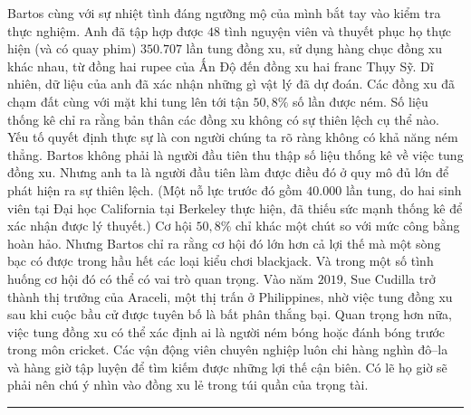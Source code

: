 \begin{multicols}{2}
	\vskip 0.01cm
	Bartos cùng với sự nhiệt tình đáng ngưỡng mộ của mình bắt tay vào kiểm tra thực nghiệm. Anh đã tập hợp được $48$ tình nguyện viên và thuyết phục họ thực hiện (và có quay phim) $350{.}707$ lần tung đồng xu, sử dụng hàng chục đồng xu khác nhau, từ đồng hai rupee của Ấn Độ đến đồng xu hai franc Thụy Sỹ. Dĩ nhiên, dữ liệu của anh  đã xác nhận những gì vật lý đã dự đoán. Các đồng xu đã chạm đất cùng với mặt khi tung lên tới tận $50,8\%$ số lần được ném.
	\vskip 0.01cm
	Số liệu thống kê chỉ ra rằng bản thân các đồng xu không có sự thiên lệch cụ thể nào. Yếu tố quyết định thực sự là con người chúng ta rõ ràng không có khả năng ném thẳng.  Bartos không phải là người đầu tiên thu thập số liệu thống kê về việc tung đồng xu. Nhưng anh ta là người đầu tiên làm được điều đó ở quy mô đủ lớn để phát hiện ra sự thiên lệch. (Một nỗ lực trước đó gồm $40{.}000$ lần tung, do hai sinh viên tại Đại học California tại Berkeley  thực hiện, đã thiếu sức mạnh thống kê để xác nhận được  lý thuyết.)
	\vskip 0.1cm
	Cơ hội $50,8\%$ chỉ khác một chút so với mức công bằng hoàn hảo. Nhưng  Bartos chỉ ra rằng cơ hội đó lớn hơn cả  lợi thế mà một sòng bạc có được trong hầu hết các loại kiểu chơi blackjack. Và trong một số tình huống cơ hội đó có thể có vai trò quan trọng. Vào năm $2019$, Sue Cudilla trở thành thị trưởng của Araceli, một thị trấn ở Philippines, nhờ việc tung đồng xu sau khi cuộc bầu cử được tuyên bố là bất phân thắng bại. Quan trọng hơn nữa, việc tung đồng xu có thể xác định ai là người ném bóng hoặc đánh bóng trước trong môn cricket. Các vận động viên chuyên nghiệp luôn chi hàng nghìn đô--la  và hàng giờ tập luyện để tìm kiếm được những lợi thế cận biên. Có lẽ họ giờ  sẽ phải nên chú ý nhìn vào đồng xu lẻ trong túi quần của trọng tài.
\end{multicols}
\vspace*{-10pt}
{\color{quantoan}\rule{1\linewidth}{0.1pt}}
\begingroup
